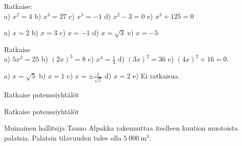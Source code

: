 \begin{tehtavasivu}

\begin{tehtava}
Ratkaise: \\
a) $ x^2 = 4 $ \qquad
b) $ x^3 = 27 $ \qquad
c) $ x^5 = -1 $ \qquad
d) $ x^2 - 3 = 0 $ \qquad
e) $ x^3 + 125 = 0 $
\begin{vastaus}
a) $ x = 2 $ \qquad
b) $ x = 3 $ \qquad
c) $ x = -1 $ \qquad
d) $ x = \sqrt{3} $ \qquad
e) $ x = -5 $ 
\end{vastaus}
\end{tehtava}

\begin{tehtava}
Ratkaise \\
a) $ 5x^2 = 25 $ \qquad
b) $ (2x)^3 = 8 $ \qquad
c) $ x^4 = \frac{1}{4} $ \qquad
d) $ (3x)^2 = 36 $ \qquad
e) $ (4x)^2 + 16 = 0 $.
\begin{vastaus}
a) $ x = \sqrt{5} $ \qquad
b) $ x = 1 $ \qquad
c) $ x = \pm\frac{1}{\sqrt{2}} $ \qquad
d) $ x = 2 $ \qquad
e) Ei ratkaisua. 
\end{vastaus}
\end{tehtava}

\begin{tehtava}
Ratkaise potenssiyhtälöt
\begin{alakohdat}
\end{alakohdat}
\end{tehtava}

\begin{tehtava}
Ratkaise potenssiyhtälöt
\begin{alakohdat}
\end{alakohdat}
\end{tehtava}

\begin{tehtava}
Muinainen hallitsija Tauno Alpakka rakennuttaa itselleen kuution muotoista palatsia.  Palatsin tilavuuden tulee olla $5~000~\mathrm{m}^3$. 
\begin{alakohdat}
\end{alakohdat}
\end{tehtava}

\end{tehtavasivu}
